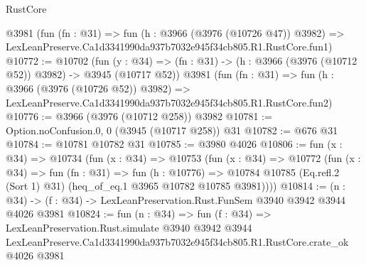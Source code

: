 \begin{lexlean}{RustCore}
\begin{coremodule}
    @3981
    (fun (fn : @31) =>
    fun (h : @3966 (@3976 (@10726 @47)) @3982) =>
    LexLeanPreserve.Ca1d3341990da937b7032e945f34cb805.R1.RustCore.fun1)
@10772 := @10702
    (fun (y : @34) => (fn : @31) -> (h : @3966 (@3976 (@10712 @52)) @3982) -> @3945 (@10717 @52))
    @3981
    (fun (fn : @31) =>
    fun (h : @3966 (@3976 (@10726 @52)) @3982) =>
    LexLeanPreserve.Ca1d3341990da937b7032e945f34cb805.R1.RustCore.fun2)
@10776 := @3966 (@3976 (@10712 @258)) @3982
@10781 := Option.noConfusion.{0, 0} (@3945 (@10717 @258)) @31
@10782 := @676 @31
@10784 := @10781 @10782 @31
@10785 := @3980 @4026
@10806 := fun (x : @34) =>
  @10734
    (fun (x : @34) =>
    @10753
      (fun (x : @34) =>
      @10772
        (fun (x : @34) =>
        fun (fn : @31) =>
        fun (h : @10776) =>
        @10784 @10785 (Eq.refl.{2} (Sort 1) @31) (heq_of_eq.{1} @3965 @10782 @10785 @3981))))
@10814 := (n : @34) -> (f : @34) -> LexLeanPreservation.Rust.FunSem @3940 @3942 @3944 @4026 @3981
@10824 := fun (n : @34) =>
  fun (f : @34) =>
  LexLeanPreservation.Rust.simulate
    @3940
    @3942
    @3944
    LexLeanPreserve.Ca1d3341990da937b7032e945f34cb805.R1.RustCore.crate_ok
    @4026
    @3981
\end{coremodule}
\end{lexlean}
